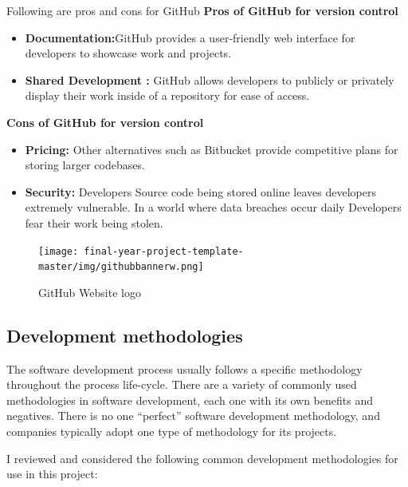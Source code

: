    
   Following are pros and cons for GitHub
       \textbf{Pros of GitHub  for version control}

 \begin{itemize}
  \item \textbf{Documentation:}GitHub provides a user-friendly  web interface for developers to showcase work and projects.
  \item   \textbf{Shared Development :}  GitHub allows developers to publicly or privately display their work inside of a repository for ease of access.
\end{itemize}

       \textbf{Cons of GitHub for version control}
       
 \begin{itemize}
 

  \item    \textbf{Pricing:} Other alternatives such as Bitbucket provide competitive plans for storing larger codebases.
  \item  \textbf{Security:}  Developers Source code being stored online leaves developers extremely vulnerable. In a world where data breaches occur daily Developers fear their work being stolen.
  
\end{itemize}


    
    \begin{figure}[H]
  \centering
    \texttt{[image: final-year-project-template-master/img/githubbannerw.png]}
         \caption{GitHub Website logo}

\end{figure}

      

    \subsection{Development methodologies}

    The software development process usually follows a specific methodology throughout the process life-cycle. There are a variety of commonly used methodologies in software development, each one with its own benefits and negatives. There is no one “perfect” software development methodology, and companies typically adopt one type of methodology for its projects. 
    
    I reviewed and considered the following common development methodologies for use in this project:

